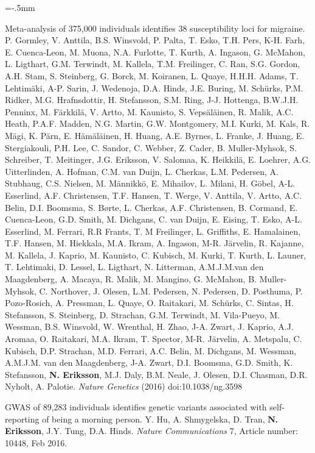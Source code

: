\documentclass[11pt]{article}
\newenvironment{papers}[1][1]
	{\vspace{-2ex}\leftmargini=16.1mm%
	 \begin{revnumerate}[{#1}]\itemsep=-.5mm}
	{\end{revnumerate}\vspace{-2ex}}
\def\paper{\item}
\begin{document}
\begin{papers}[47]
            \paper
        Meta-analysis of 375,000 individuals identifies 38 susceptibility loci for migraine.
        P. Gormley, V. Anttila, B.S. Winsvold, P. Palta, T. Esko, T.H. Pers, K-H. Farh, E. Cuenca-Leon, M. Muona, N.A. Furlotte, T. Kurth, A. Ingason, G. McMahon, L. Ligthart, G.M. Terwindt, M. Kallela, T.M. Freilinger, C. Ran, S.G. Gordon, A.H. Stam, S. Steinberg, G. Borck, M. Koiranen, L. Quaye, H.H.H. Adams, T. Lehtimäki, A-P. Sarin, J. Wedenoja, D.A. Hinds, J.E. Buring, M. Schürks, P.M. Ridker, M.G. Hrafnsdottir, H. Stefansson, S.M. Ring, J-J. Hottenga, B.W.J.H. Penninx, M. Färkkilä, V. Artto, M. Kaunisto, S. Vepsäläinen, R. Malik, A.C. Heath, P.A.F. Madden, N.G. Martin, G.W. Montgomery, M.I. Kurki, M. Kals, R. Mägi, K. Pärn, E. Hämäläinen, H. Huang, A.E. Byrnes, L. Franke, J. Huang, E. Stergiakouli, P.H. Lee, C. Sandor, C. Webber, Z. Cader, B. Muller-Myhsok, S. Schreiber, T. Meitinger, J.G. Eriksson, V. Salomaa, K. Heikkilä, E. Loehrer, A.G. Uitterlinden, A. Hofman, C.M. van Duijn, L. Cherkas, L.M. Pedersen, A. Stubhaug, C.S. Nielsen, M. Männikkö, E. Mihailov, L. Milani, H. Göbel, A-L. Esserlind, A.F. Christensen, T.F. Hansen, T. Werge, V. Anttila, V. Artto, A.C. Belin, D.I. Boomsma, S. Børte, L. Cherkas, A.F. Christensen, B. Cormand, E. Cuenca-Leon, G.D. Smith, M. Dichgans, C. van Duijn, E. Eising, T. Esko, A-L. Esserlind, M. Ferrari, R.R Frants, T. M Freilinger, L. Griffiths, E. Hamalainen, T.F. Hansen, M. Hiekkala, M.A. Ikram, A. Ingason, M-R. Järvelin, R. Kajanne, M. Kallela, J. Kaprio, M. Kaunisto, C. Kubisch, M. Kurki, T. Kurth, L. Launer, T. Lehtimaki, D. Lessel, L. Ligthart, N. Litterman, A.M.J.M.van den Maagdenberg, A. Macaya, R. Malik, M. Mangino, G. McMahon, B. Muller-Myhsok, C. Northover, J. Olesen, L.M. Pedersen, N. Pedersen, D. Posthuma, P. Pozo-Rosich, A. Pressman, L. Quaye, O. Raitakari, M. Schürks, C. Sintas, H. Stefansson, S. Steinberg, D. Strachan, G.M. Terwindt, M. Vila-Pueyo, M. Wessman, B.S. Winsvold, W. Wrenthal, H. Zhao, J-A. Zwart, J. Kaprio, A.J. Aromaa, O. Raitakari, M.A. Ikram, T. Spector, M-R. Järvelin, A. Metspalu, C. Kubisch, D.P. Strachan, M.D. Ferrari, A.C. Belin, M. Dichgans, M. Wessman, A.M.J.M. van den Maagdenberg, J-A. Zwart, D.I. Boomsma, G.D. Smith, K. Stefansson, \textbf{N. Eriksson}, M.J. Daly, B.M. Neale, J. Olesen, D.I. Chasman, D.R. Nyholt, A. Palotie.
        \textit{Nature Genetics} (2016) doi:10.1038/ng.3598

            \paper
        GWAS of 89,283 individuals identifies genetic variants associated with self-reporting of being a morning person.
        Y. Hu, A. Shmygelska, D. Tran, \textbf{N. Eriksson}, J.Y. Tung, D.A. Hinds.
        \textit{Nature Communications} 7, Article number: 10448, Feb 2016.


\end{papers}
\end{document}
